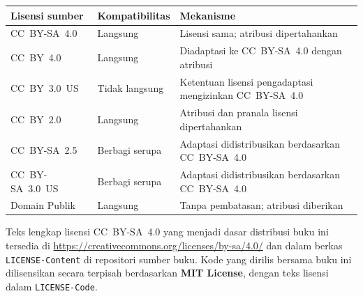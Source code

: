 \begin{center}
\renewcommand{\arraystretch}{1.25}
\begin{tabular}{l l l}
\toprule
\textbf{Lisensi sumber} & \textbf{Kompatibilitas} & \textbf{Mekanisme} \\
\midrule
CC~BY-SA~4.0 & Langsung & Lisensi sama; atribusi dipertahankan \\
CC~BY~4.0    & Langsung & Diadaptasi ke CC~BY-SA~4.0 dengan atribusi \\
CC~BY~3.0~US & Tidak langsung & Ketentuan lisensi pengadaptasi mengizinkan CC~BY-SA~4.0 \\
CC~BY~2.0 & Langsung & Atribusi dan pranala lisensi dipertahankan \\
CC~BY-SA~2.5 & Berbagi serupa & Adaptasi didistribusikan berdasarkan CC~BY-SA~4.0 \\
CC~BY-SA~3.0~US & Berbagi serupa & Adaptasi didistribusikan berdasarkan CC~BY-SA~4.0 \\
Domain Publik & Langsung & Tanpa pembatasan; atribusi diberikan \\
\bottomrule
\end{tabular}
\end{center}

\noindent Teks lengkap lisensi CC~BY-SA~4.0 yang menjadi dasar distribusi
buku ini tersedia di \url{https://creativecommons.org/licenses/by-sa/4.0/}
dan dalam berkas \texttt{LICENSE-Content} di repositori sumber buku.
Kode yang dirilis bersama buku ini dilisensikan secara terpisah berdasarkan
\textbf{MIT License}, dengan teks lisensi dalam \texttt{LICENSE-Code}.

\cleardoublepage
